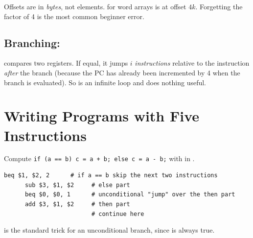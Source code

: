 \begin{important}
Offsets are in \emph{bytes}, not elements.  for word arrays is at
offset $4k$. Forgetting the factor of 4 is the most common beginner error.
\end{important}

\subsection{Branching: }

 compares two registers. If equal, it jumps $i$ \emph{instructions}
relative to the instruction \emph{after} the branch (because the PC has
already been incremented by 4 when the branch is evaluated). So
 is an infinite loop and  does
nothing useful.

\section{Writing Programs with Five Instructions}

\begin{example}[If statement]
Compute \lstinline[style=c]|if (a == b) c = a + b; else c = a - b;| with
 in .
\begin{lstlisting}[style=mips]
      beq $1, $2, 2      # if a == b skip the next two instructions
      sub $3, $1, $2     # else part
      beq $0, $0, 1      # unconditional "jump" over the then part
      add $3, $1, $2     # then part
                         # continue here
\end{lstlisting}
 is the standard trick for an unconditional branch,
since  is always true.
\end{example}


